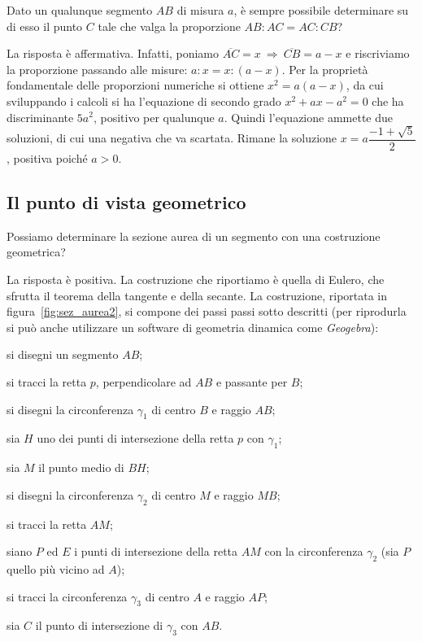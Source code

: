 Dato un qualunque segmento $AB$ di misura $a$, è sempre possibile determinare su di esso il punto $C$ tale che valga la proporzione $AB : AC = AC : CB$?

La risposta è affermativa. Infatti, poniamo $\overline{AC}=x\:\Rightarrow\:\overline{CB}=a-x$ e riscriviamo la proporzione passando alle misure: $a : x = x : (a-x)$.
Per la proprietà fondamentale delle proporzioni numeriche si ottiene $x^2=a(a-x)$, da cui  sviluppando i calcoli si ha l'equazione di secondo grado $x^2+ax-a^2=0$ che ha discriminante $5a^2$, positivo per qualunque $a$. Quindi l'equazione ammette due soluzioni, di cui una negativa che va scartata. Rimane la soluzione $x=a\dfrac{-1+\sqrt{5}}{2}$, positiva poiché $a>0$.

\subsection{Il punto di vista geometrico}

Possiamo determinare la sezione aurea di un segmento con una costruzione geometrica?

La risposta è positiva. La costruzione che riportiamo è quella di Eulero, che sfrutta il teorema della tangente e della secante.
La costruzione, riportata in figura~\ref{fig:sez_aurea2}, si compone dei passi passi sotto descritti (per riprodurla si può anche utilizzare un software di geometria dinamica come \emph{Geogebra}):

\begin{enumerate*}
\item si disegni un segmento $AB$;
\item si tracci la retta $p$, perpendicolare ad $AB$ e passante per $B$;
\item si disegni la circonferenza $\gamma_1$ di centro $B$ e raggio $AB$;
\item sia $H$ uno dei punti di intersezione della retta $p$ con $\gamma_1$;
\item sia $M$ il punto medio di $BH$;
\item si disegni la circonferenza $\gamma_2$ di centro $M$ e raggio $MB$;
\item si tracci la retta $AM$;
\item siano $P$ ed $E$ i punti di intersezione della retta $AM$ con la circonferenza $\gamma_2$ (sia $P$ quello più vicino ad $A$);
\item si tracci la circonferenza $\gamma_3$ di centro $A$ e raggio $AP$;
\item sia $C$ il punto di intersezione di $\gamma_3$ con $AB$.
\end{enumerate*}

